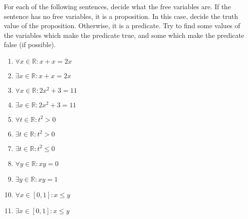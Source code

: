 \begin{xca}
	For each of the following sentences, decide what the free variables are.  If the sentence has no free variables, it is a proposition.  In this case, decide the truth value of the proposition.  Otherwise, it is a predicate.  Try to find some values of the variables which make the predicate true, and some which make the predicate false (if possible).
	
	\begin{enumerate}
			\item $\forall x \in \mathbb{R}: x + x = 2x$
			\item $\exists x \in \mathbb{R}: x + x = 2x$
			\item $\forall x \in \mathbb{R}: 2x^2 + 3 = 11$
			\item $\exists x \in \mathbb{R}: 2x^2 + 3 = 11$
			\item $\forall t \in \mathbb{R}: t^2 > 0$
			\item $\exists t \in \mathbb{R}: t^2 > 0$
			\item $\exists t \in \mathbb{R}: t^2 \leq 0$
			\item $\forall y \in \mathbb{R}:  xy = 0$
			\item $\exists y \in \mathbb{R}:  xy = 1$
			\item $\forall x \in [0,1]:  x \leq y$
			\item $\exists x \in [0,1]: x \leq y$
		\end{enumerate}
	\end{xca}

